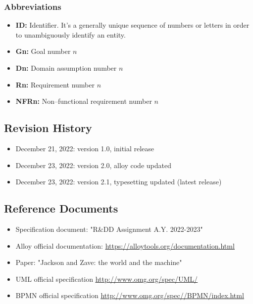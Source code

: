 \subsubsection{Abbreviations}
\begin{itemize}
        \item \textbf{ID:} Identifier. It's a generally unique sequence of numbers or letters in order to unambiguously identify an entity.
        \item \textbf{Gn:} Goal number $n$
        \item \textbf{Dn:} Domain assumption number $n$
        \item \textbf{Rn:} Requirement number $n$
        \item \textbf{NFRn:} Non--functional requirement number $n$
\end{itemize}
\subsection{Revision History}
\begin{itemize}
        \item December 21, 2022: version 1.0, initial release
        \item December 23, 2022: version 2.0, alloy code updated
        \item December 23, 2022: version 2.1, typesetting updated (latest release)
    \end{itemize}
\subsection{Reference Documents}
\begin{itemize}
        \item Specification document: "R\&DD Assignment A.Y. 2022-2023"
        \item Alloy official documentation: \underline{\url{https://alloytools.org/documentation.html}}
        \item Paper: "Jackson and Zave: the world and the machine"
        \item UML official specification \underline{\url{http://www.omg.org/spec/UML/}}
        \item BPMN official specification \underline{\url{http://www.omg.org/spec//BPMN/index.html}}
\end{itemize}
